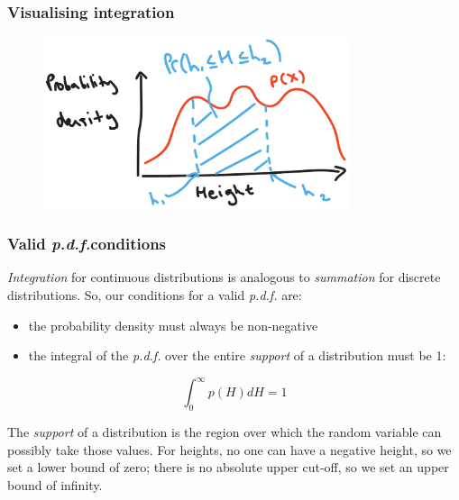 \documentclass{beamer}
\begin{document}
	\begin{frame}
		\frametitle{Visualising integration}
		
		\begin{figure}[ht]
			\centerline{\includegraphics[width=0.8\textwidth]{./figures/height_density_area.pdf}}
		\end{figure}
		
	\end{frame}
	
	\begin{frame}
		\frametitle{Valid \textit{p.d.f.}conditions}
		
		\textit{Integration} for continuous distributions is analogous to \textit{summation} for discrete distributions. So, our conditions for a valid \textit{p.d.f.} are:
		
		\begin{itemize}
			\item the probability density must always be non-negative
			\item the integral of the \textit{p.d.f.} over the entire \textit{support} of a distribution must be 1:
		\end{itemize}
		
		\begin{equation}
		\int_{0}^{\infty} p(H) dH = 1
		\end{equation}
		
		The \textit{support} of a distribution is the region over which the random variable can possibly take those values. For heights, no one can have a negative height, so we set a lower bound of zero; there is no absolute upper cut-off, so we set an upper bound of infinity.
		
	\end{frame}
	
\end{document}
